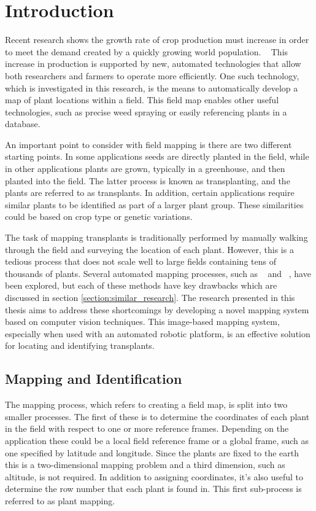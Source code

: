 
\cleardoublepage

\chapter{Introduction}
\label{introduction}

Recent research shows the growth rate of crop production must increase in order to meet the demand created by a quickly growing world population. ~\citep{tester:2010}  This increase in production is supported by new, automated technologies that allow both researchers and farmers to operate more efficiently.  One such technology, which is investigated in this research, is the means to automatically develop a map of plant locations within a field.  This field map enables other useful technologies, such as precise weed spraying or easily referencing plants in a database. 
 
An important point to consider with field mapping is there are two different starting points.  In some applications seeds are directly planted in the field, while in other applications plants are grown, typically in a greenhouse, and then planted into the field.  The latter process is known as transplanting, and the plants are referred to as transplants.  In addition, certain applications require similar plants to be identified as part of a larger plant group.  These similarities could be based on crop type or genetic variations. 

The task of mapping transplants is traditionally performed by manually walking through the field and surveying the location of each plant. However, this is a tedious process that does not scale well to large fields containing tens of thousands of plants.  Several automated mapping processes, such as ~\citep{Perez-Ruiz:2012} and ~\citep{Soille:2000}, have been explored, but each of these methods have key drawbacks which are discussed in section \ref{section:similar_research}.  The research presented in this thesis aims to address these shortcomings by developing a novel mapping system based on computer vision techniques.  This image-based mapping system, especially when used with an automated robotic platform, is an effective solution for locating and identifying transplants. 

\section{Mapping and Identification}

The mapping process, which refers to creating a field map, is split into two smaller processes.  The first of these is to determine the coordinates of each plant in the field with respect to one or more reference frames.  Depending on the application these could be a local field reference frame or a global frame, such as one specified by latitude and longitude.  Since the plants are fixed to the earth this is a two-dimensional mapping problem and a third dimension, such as altitude, is not required.  In addition to assigning coordinates, it's also useful to determine the row number that each plant is found in.  This first sub-process is referred to as plant mapping. 

